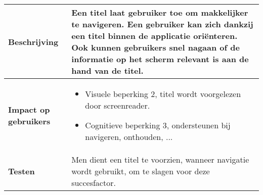 \begin{table}[H]
\begin{tabular}{|l|p{12cm}|}
        \hline
        \textbf{Beschrijving}                 & Een titel laat gebruiker toe om makkelijker te navigeren. Een gebruiker kan zich dankzij een titel binnen de applicatie oriënteren. Ook kunnen gebruikers snel nagaan of de informatie op het scherm relevant is aan de hand van de titel.\\ 
        \hline
        \textbf{Impact op gebruikers}         &  
        \begin{itemize}
            \item Visuele beperking 2, titel wordt voorgelezen door screenreader.
            \item Cognitieve beperking 3, ondersteunen bij navigeren, onthouden, ...
        \end{itemize}                                                                                                                                                                                                                                                                                                                                                                                                                    \\ 
        \hline
        \textbf{Testen}                       & Men dient een titel te voorzien, wanneer navigatie wordt gebruikt, om te slagen voor deze succesfactor.                                                                                                                                                                                                      \\
        \hline
    \end{tabular}
    
\end{table}


